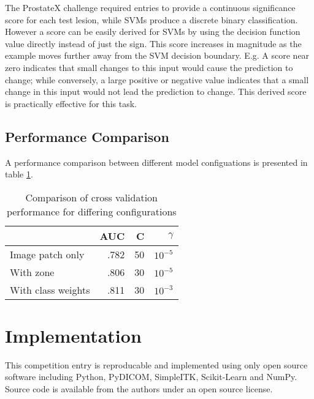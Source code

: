\documentclass[a4paper]{spie}
\begin{document}
The ProstateX challenge required entries to provide a continuous significance score for each test lesion, while SVMs produce a discrete binary classification. However a score can be easily derived for SVMs by using the decision function value directly instead of just the sign. This score increases in magnitude as the example moves further away from the SVM decision boundary. E.g. A score near zero indicates that small changes to this input would cause the prediction to change; while conversely, a large positive or negative value indicates that a small change in this input would not lead the prediction to change. This derived score is practically effective for this task.

\subsection{Performance Comparison}

A performance comparison between different model configuations is presented in table \ref{table:performance}.

\begin{table}[h]
  \caption{Comparison of cross validation performance for differing configurations}
  \label{table:performance}

  \begin{center}
  \begin{tabular}{ l | r | r | r }
    & AUC  & C  & $\gamma$ \\
    \hline
    Image patch only    & .782 & 50 & $10^{-5}$  \\
    With zone           & .806 & 30 & $10^{-5}$  \\
    With class weights  & .811 & 30 & $10^{-3}$  \\
  \end{tabular}
  \end{center}
\end{table}

\section{Implementation}

This competition entry is reproducable and implemented using only open source software including Python, PyDICOM, SimpleITK\cite{simpleitk}, Scikit-Learn\cite{scikit-learn} and NumPy\cite{numpy}. Source code is available from the authors under an open source license.

\end{document}
